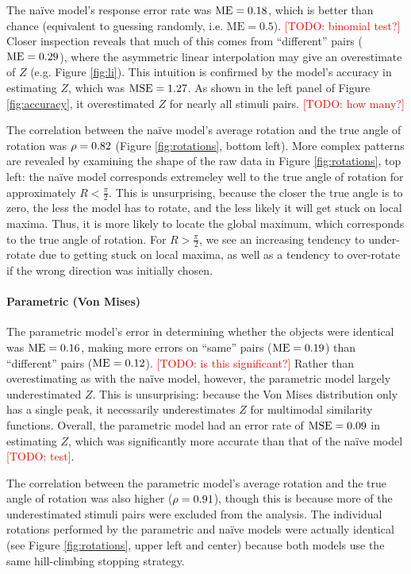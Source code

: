 \documentclass{article} %
\newcommand{\TODO}[1]{\textcolor{red}{[TODO: #1]}}
\newcommand{\ME}[0]{\mathrm{ME}}
\newcommand{\naive}[0]{na\"ive}
\begin{document}
The \naive{} model's response error rate was $\NaiveME{}$, which is
better than chance (equivalent to guessing randomly,
i.e. $\ME{}=0.5$). \TODO{binomial test?} Closer inspection reveals
that much of this comes from ``different'' pairs ($\NaiveMEdiff{}$),
where the asymmetric linear interpolation may give an overestimate of
$Z$ (e.g. Figure \ref{fig:li}).  This intuition is confirmed by the
model's accuracy in estimating $Z$, which was $\mathrm{MSE}{}=1.27{}$. As shown
in the left panel of Figure \ref{fig:accuracy}, it overestimated $Z$
for nearly all stimuli pairs. \TODO{how many?}

The correlation between the \naive{} model's average rotation and the
true angle of rotation was $\rho=0.82{}$ (Figure \ref{fig:rotations},
bottom left). More complex patterns are revealed by examining the
shape of the raw data in Figure \ref{fig:rotations}, top left: the
\naive{} model corresponds extremeley well to the true angle of
rotation for approximately $R<\frac{\pi}{2}$. This is unsurprising,
because the closer the true angle is to zero, the less the model has
to rotate, and the less likely it will get stuck on local
maxima. Thus, it is more likely to locate the global maximum, which
corresponds to the true angle of rotation. For $R>\frac{\pi}{2}$, we
see an increasing tendency to under-rotate due to getting stuck on
local maxima, as well as a tendency to over-rotate if the wrong
direction was initially chosen.


\paragraph{Parametric (Von Mises)}

The parametric model's error in determining whether the objects were
identical was $\VMME{}$, making more errors on ``same'' pairs
($\VMMEsame{}$) than ``different'' pairs ($\VMMEdiff{}$). \TODO{is
  this significant?} Rather than overestimating as with the \naive{}
model, however, the parametric model largely underestimated $Z$. This
is unsurprising: because the Von Mises distribution only has a single
peak, it necessarily underestimates $Z$ for multimodal similarity
functions. Overall, the parametric model had an error rate of
$\mathrm{MSE}{}=0.09{}$ in estimating $Z$, which was significantly more accurate
than that of the \naive{} model \TODO{test}.

The correlation between the parametric model's average rotation and
the true angle of rotation was also higher ($\rho=0.91{}$), though this
is because more of the underestimated stimuli pairs were excluded from
the analysis. The individual rotations performed by the parametric and
\naive{} models were actually identical (see Figure
\ref{fig:rotations}, upper left and center) because both models use
the same hill-climbing stopping strategy.
\end{document}
